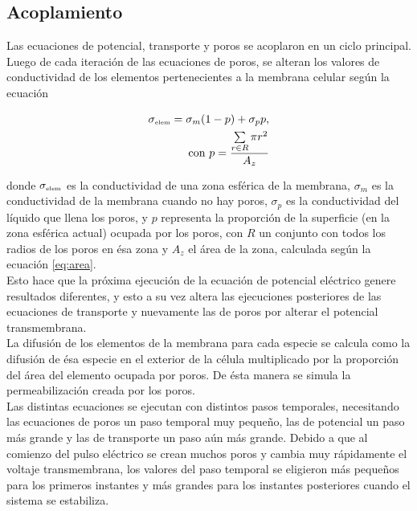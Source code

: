 \documentclass[a4paper,10pt]{article}
\begin{document}
\subsection{Acoplamiento}
Las ecuaciones de potencial, transporte y poros se acoplaron en un ciclo principal. Luego de cada iteración de las ecuaciones de poros, se alteran los valores de conductividad de los elementos pertenecientes a la membrana celular según la ecuación 

\begin{equation} \begin{split}
	\sigma_{\textrm{\tiny elem}} = \sigma_m (1 - p) + \sigma_p p, \\ \textrm{con } p = \frac{ \sum\limits_{r \in R} \pi r^2 }{A_z}
\end{split} \end{equation} 

donde $\sigma_{\textrm{\tiny elem}}$ es la conductividad de una zona esférica de la membrana, $\sigma_m$ es la conductividad de la membrana cuando no hay poros, $\sigma_p$ es la conductividad del líquido que llena los poros, y $p$ representa la proporción de la superficie (en la zona esférica actual) ocupada por los poros, con $R$ un conjunto con todos los radios de los poros en ésa zona y $A_z$ el área de la zona, calculada según la ecuación \ref{eq:area}.\\

Esto hace que la próxima ejecución de la ecuación de potencial eléctrico genere resultados diferentes, y esto a su vez altera las ejecuciones posteriores de las ecuaciones de transporte y nuevamente las de poros por alterar el potencial transmembrana.\\

La difusión de los elementos de la membrana para cada especie se calcula como la difusión de ésa especie en el exterior de la célula multiplicado por la proporción del área del elemento ocupada por poros. De ésta manera se simula la permeabilización creada por los poros.\\

Las distintas ecuaciones se ejecutan con distintos pasos temporales, necesitando las ecuaciones de poros un paso temporal muy pequeño, las de potencial un paso más grande y las de transporte un paso aún más grande. Debido a que al comienzo del pulso eléctrico se crean muchos poros y cambia muy rápidamente el voltaje transmembrana, los valores del paso temporal se eligieron más pequeños para los primeros instantes y más grandes para los instantes posteriores cuando el sistema se estabiliza.\\
\end{document}
